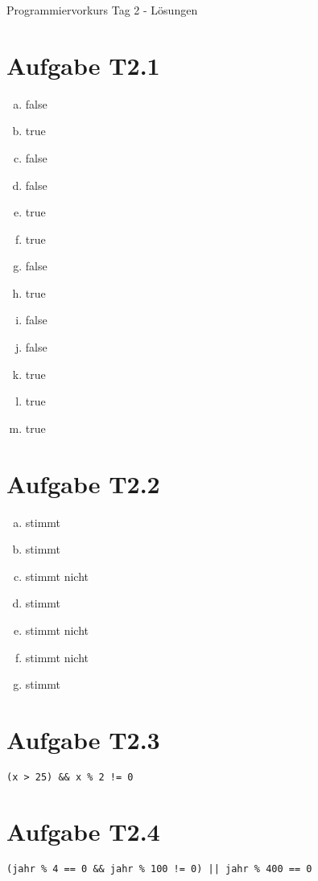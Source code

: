 \documentclass[final,a4paper]{article}
\begin{document}


{\huge Programmiervorkurs Tag 2 - Lösungen}

\bigskip

\section*{Aufgabe T2.1}
\begin{enumerate}[(a)]
	\item false
	\item true
	\item false
	\item false
	\item true
	\item true
	\item false
	\item true
	\item false
	\item false
	\item true
	\item true
	\item true
\end{enumerate}

\section*{Aufgabe T2.2}
\begin{enumerate}[(a)]
	\item stimmt
	\item stimmt
	\item stimmt nicht
	\item stimmt
	\item stimmt nicht
	\item stimmt nicht
	\item stimmt
\end{enumerate}


\section*{Aufgabe T2.3}
\begin{lstlisting}
(x > 25) && x % 2 != 0
\end{lstlisting}

\section*{Aufgabe T2.4}
\begin{lstlisting}
(jahr % 4 == 0 && jahr % 100 != 0) || jahr % 400 == 0
\end{lstlisting}
\end{document}
